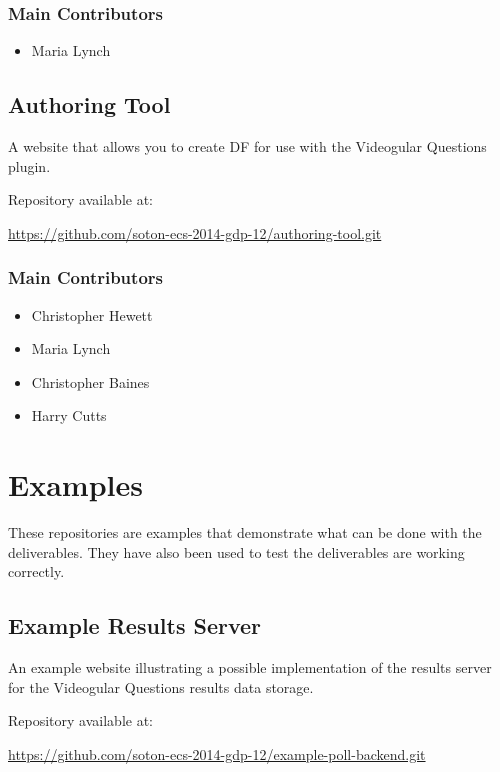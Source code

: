\subsubsection{Main Contributors}
\begin{itemize}
  \item Maria Lynch
\end{itemize}

\subsection{Authoring Tool}
\label{Section:Repo_authoring_tool}

A website that allows you to create \gls{DF} for use with the Videogular Questions plugin.

Repository available at:

\url{https://github.com/soton-ecs-2014-gdp-12/authoring-tool.git}

\subsubsection{Main Contributors}
\begin{itemize}
  \item Christopher Hewett
  \item Maria Lynch
  \item Christopher Baines
  \item Harry Cutts
\end{itemize}

\section{Examples}

These repositories are examples that demonstrate what can be done with the deliverables. They have also been used to test the deliverables are working correctly.

\subsection{Example Results Server}
\label{Section:Repo_example_poll_backend}

An example website illustrating a possible implementation of the results server for the Videogular Questions results data storage.

Repository available at:

\url{https://github.com/soton-ecs-2014-gdp-12/example-poll-backend.git}

